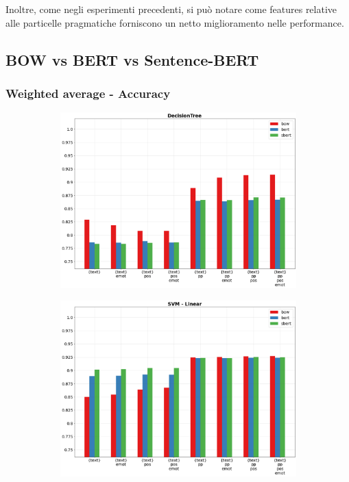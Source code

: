 \documentclass[oneside]{book}
\begin{document}
Inoltre, come negli esperimenti precedenti, si può notare come features relative alle particelle pragmatiche forniscono un netto miglioramento nelle performance.

\newpage

\subsection{BOW vs BERT vs Sentence-BERT}

\subsubsection{Weighted average - Accuracy}

\begin{figure}[!h]
	\hspace*{-3cm}
	\begin{subfigure}[b]{0.5\textwidth}
		\centering
		\includegraphics[width=10cm]{assets/reports/text/acc/DecisionTree.png}
	\end{subfigure}
	\hfill
	\begin{subfigure}[b]{0.5\textwidth}		
		\centering
		\hspace*{0.15cm}
		\includegraphics[width=10cm]{assets/reports/text/acc/SVM - Linear.png}
	\end{subfigure}
\end{figure}
\end{document}
